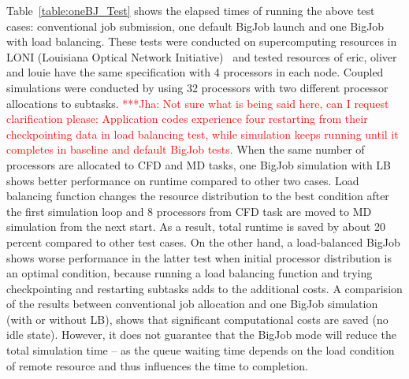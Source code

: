 \documentclass[conference,final]{IEEEtran}
\newcommand{\jhanote}[1]{ {\textcolor{red} { ***Jha: #1 }}}
\newcommand{\jhanote}[1]{}
\begin{document}
Table~\ref{table:oneBJ_Test} shows the elapsed times of running the above test cases: conventional job submission, one default BigJob launch and one BigJob with load balancing. These tests were conducted on supercomputing resources in LONI (Louisiana Optical Network Initiative)~\cite{LONI_web} and tested resources of eric, oliver and louie have the same specification with 4 processors in each node. Coupled simulations were conducted by using 32 processors with two different processor allocations to subtasks. \jhanote{Not sure what is being said here, can I request clarification please: Application codes experience four restarting from their checkpointing data in load balancing test, while simulation keeps running until it completes in baseline and default BigJob tests.}  When the same number of processors are allocated to CFD and MD tasks, one BigJob simulation with LB shows better performance on runtime compared to other two cases. Load balancing function changes the resource distribution to the best condition after the first simulation loop and 8 processors from CFD task are moved to MD simulation from the next start. As a result, total runtime is saved by about 20 percent compared to other test cases. On the other hand, a load-balanced BigJob shows worse performance in the latter test when initial processor distribution is an optimal condition, because running a load balancing function and trying checkpointing and restarting subtasks adds to the additional costs.  A comparision of the results between conventional job allocation and one BigJob simulation (with or without LB), shows that significant computational costs are saved (no idle state). However, it does not guarantee that the BigJob mode will reduce the total simulation time -- as the queue waiting time depends on the load condition of remote resource and thus influences the time to completion.


\end{document}

